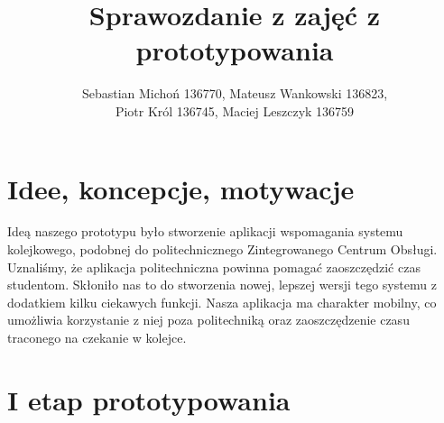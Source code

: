 \documentclass[12pt]{article}
\begin{document}
\title{Sprawozdanie z zajęć z prototypowania}
\author{Sebastian Michoń 136770, Mateusz Wankowski 136823,\\ Piotr Król 136745, Maciej Leszczyk 136759}
\date{\vspace{-3ex}}
\maketitle

\section{Idee, koncepcje, motywacje}
Ideą naszego prototypu było stworzenie aplikacji wspomagania systemu kolejkowego, podobnej do politechnicznego Zintegrowanego Centrum Obsługi. Uznaliśmy, że aplikacja politechniczna powinna pomagać zaoszczędzić czas studentom. Skłoniło nas to do stworzenia nowej, lepszej wersji tego systemu z dodatkiem kilku ciekawych funkcji. Nasza aplikacja ma charakter mobilny, co umożliwia korzystanie z niej poza politechniką oraz zaoszczędzenie czasu traconego na czekanie w kolejce.

\section{I etap prototypowania}
\end{document}
